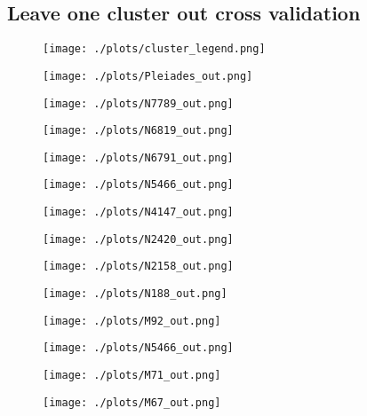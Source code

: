 \documentclass[12pt, preprint]{aastex}
\begin{document}
\subsection{Leave one cluster out cross validation}

\begin{figure}
  \texttt{[image: ./plots/cluster\_legend.png]}
  \end{figure}
\begin{figure}
  \texttt{[image: ./plots/Pleiades\_out.png]}
  \end{figure}
\begin{figure}[h!]
  \texttt{[image: ./plots/N7789\_out.png]}
  \end{figure}
\begin{figure}[h!]
  \texttt{[image: ./plots/N6819\_out.png]}
  \end{figure}
\begin{figure}[h!]
  \texttt{[image: ./plots/N6791\_out.png]}
  \end{figure}
\begin{figure}[h!]
  \texttt{[image: ./plots/N5466\_out.png]}
  \end{figure}
\begin{figure}[h!]
  \texttt{[image: ./plots/N4147\_out.png]}
  \end{figure}
\begin{figure}[h!]
  \texttt{[image: ./plots/N2420\_out.png]}
  \end{figure}
\begin{figure}[h!]
  \texttt{[image: ./plots/N2158\_out.png]}
  \end{figure}
\begin{figure}[h!]
  \texttt{[image: ./plots/N188\_out.png]}
  \end{figure}
\begin{figure}[h!]
  \texttt{[image: ./plots/M92\_out.png]}
  \end{figure}
\begin{figure}[h!]
  \texttt{[image: ./plots/N5466\_out.png]}
    \end{figure}
\begin{figure}[h!]
  \texttt{[image: ./plots/M71\_out.png]}
    \end{figure}
    
\begin{figure}[h!]
  \texttt{[image: ./plots/M67\_out.png]}
    \end{figure}
\end{document}
